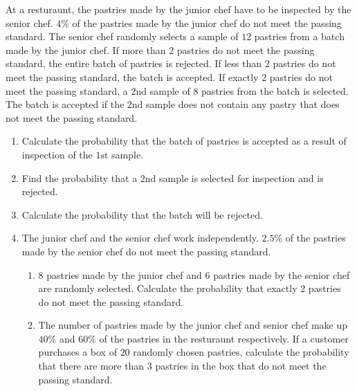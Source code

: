\documentclass[11pt,a4paper]{book}
\begin{document}
\begin{example}

At a resturaunt, the pastries made by the junior chef have to be inspected
by the senior chef. $4\%$ of the pastries made by the junior chef
do not meet the passing standard. The senior chef randomly selects
a sample of $12$ pastries from a batch made by the junior chef. If
more than $2$ pastries do not meet the passing standard, the entire
batch of pastries is rejected. If less than $2$ pastries do not meet
the passing standard, the batch is accepted. If exactly $2$ pastries
do not meet the passing standard, a $2\text{nd}$ sample of $8$ pastries
from the batch is selected. The batch is accepted if the $2\text{nd}$
sample does not contain any pastry that does not meet the passing
standard.

\begin{enumerate}[label=(\alph*)]

\item  Calculate the probability that the batch of pastries is accepted
as a result of inspection of the $1\text{st}$ sample.

\item  Find the probability that a $2\text{nd}$ sample is selected for inspection and is rejected.

\item  Calculate the probability that the batch will be rejected.

\item  The junior chef and the senior chef work independently. $2.5\%$
of the pastries made by the senior chef do not meet the passing standard.

\begin{enumerate}[label=(\roman*)]

\item  $8$ pastries made by the junior chef and $6$ pastries made
by the senior chef are randomly selected. Calculate the probability
that exactly $2$ pastries do not meet the passing standard.

\item  The number of pastries made by the junior chef and senior
chef make up $40\%$ and $60\%$ of the pastries in the resturaunt
respectively. If a customer purchases a box of $20$ randomly chosen
pastries, calculate the probability that there are more than $3$
pastries in the box that do not meet the passing standard.

\end{enumerate}


\end{enumerate}
\end{example}
\end{document}
